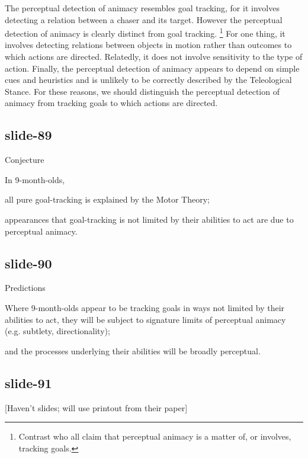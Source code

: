 \documentclass[12pt,\papersize]{extarticle}
\begin{document}
The perceptual detection of animacy resembles goal tracking, for it involves detecting a relation
between a chaser and its target.
However the perceptual detection of animacy is clearly distinct from goal tracking.%
\footnote{%
Contrast \citet{schlottmann:2010_goal,Scholl:2000eq} who all claim that perceptual animacy is a matter of, or involves, tracking goals.
}
For one thing, it involves detecting relations between objects in motion rather than outcomes to
which actions are directed.
Relatedly, it does not involve sensitivity to the type of action.
Finally, the perceptual detection of animacy appears to depend on simple cues and heuristics and is
unlikely to be correctly described by the Teleological Stance.
For these reasons, we should distinguish the perceptual detection of animacy from tracking goals to which actions are directed.
 
\subsection{slide-89}
Conjecture


          
In 9-month-olds,
          


          
all pure goal-tracking is explained by the Motor Theory;
          


          
appearances that goal-tracking is not limited by their abilities to act
are due to perceptual animacy.
          

 
\subsection{slide-90}
Predictions
            


            
Where 9-month-olds appear to be tracking goals 
in ways not limited by their abilities to act,
they will be subject to signature limits of perceptual animacy
(e.g. subtlety, directionality);


            
and the processes underlying their abilities will be broadly perceptual.
            

 
\subsection{slide-91}
[Haven’t slides; will use printout from their paper]
 
\end{document}
